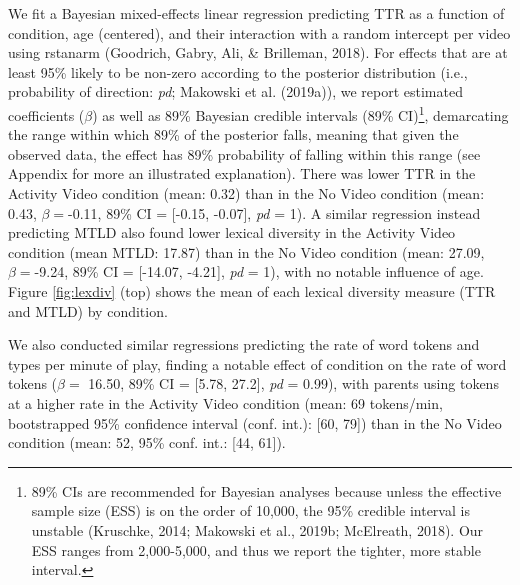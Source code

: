 \documentclass[man,floatsintext]{apa6}
\begin{document}
We fit a Bayesian mixed-effects linear regression predicting TTR as a function of condition, age (centered), and their interaction with a random intercept per video using rstanarm (Goodrich, Gabry, Ali, \& Brilleman, 2018).
For effects that are at least 95\% likely to be non-zero according to the posterior distribution (i.e., probability of direction: \emph{pd}; Makowski et al. (2019a)), we report estimated coefficients (\(\beta\)) as well as 89\% Bayesian credible intervals (89\% CI)\footnote{89\% CIs are recommended for Bayesian analyses because unless the effective sample size (ESS) is on the order of 10,000, the 95\% credible interval is unstable (Kruschke, 2014; Makowski et al., 2019b; McElreath, 2018). Our ESS ranges from 2,000-5,000, and thus we report the tighter, more stable interval.}, demarcating the range within which 89\% of the posterior falls, meaning that given the observed data, the effect has 89\% probability of falling within this range (see Appendix for more an illustrated explanation).
There was lower TTR in the Activity Video condition (mean: 0.32) than in the No Video condition (mean: 0.43, \(\beta=\)-0.11, 89\% CI = {[}-0.15, -0.07{]}, \emph{pd} = 1).
A similar regression instead predicting MTLD also found lower lexical diversity in the Activity Video condition (mean MTLD: 17.87) than in the No Video condition (mean: 27.09, \(\beta=\)-9.24, 89\% CI = {[}-14.07, -4.21{]}, \emph{pd} = 1), with no notable influence of age.
Figure \ref{fig:lexdiv} (top) shows the mean of each lexical diversity measure (TTR and MTLD) by condition.

We also conducted similar regressions predicting the rate of word tokens and types per minute of play, finding a notable effect of condition on the rate of word tokens (\(\beta=\) 16.50, 89\% CI = {[}5.78, 27.2{]}, \emph{pd} = 0.99), with parents using tokens at a higher rate in the Activity Video condition (mean: 69 tokens/min, bootstrapped 95\% confidence interval (conf. int.): {[}60, 79{]}) than in the No Video condition (mean: 52, 95\% conf. int.: {[}44, 61{]}).
\end{document}
